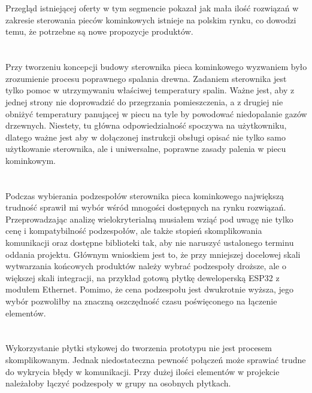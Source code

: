 \documentclass[11pt]{report}
\begin{document}
\section{}
Przegląd istniejącej oferty w tym segmencie pokazał jak mała ilość rozwiązań w zakresie sterowania pieców kominkowych istnieje na polskim rynku, co dowodzi temu, że potrzebne są nowe propozycje produktów.

\section{}
Przy tworzeniu koncepcji budowy sterownika pieca kominkowego wyzwaniem było zrozumienie procesu poprawnego spalania drewna. Zadaniem sterownika jest tylko pomoc w utrzymywaniu właściwej temperatury spalin. Ważne jest, aby z jednej strony nie doprowadzić do przegrzania pomieszczenia, a z drugiej nie obniżyć temperatury panującej w piecu na tyle by powodować niedopalanie gazów drzewnych. Niestety, tu główna odpowiedzialność spoczywa na użytkowniku, dlatego ważne jest aby w dołączonej instrukcji obsługi opisać nie tylko samo użytkowanie sterownika, ale i uniwersalne, poprawne zasady palenia w piecu kominkowym.

\section{}
Podczas wybierania podzespołów sterownika pieca kominkowego największą trudność sprawił mi wybór wśród mnogości dostępnych na rynku rozwiązań. Przeprowadzając analizę wielokryterialną musiałem wziąć pod uwagę nie tylko cenę i kompatybilność podzespołów, ale także stopień skomplikowania komunikacji oraz dostępne biblioteki tak, aby nie naruszyć ustalonego terminu oddania projektu.
Głównym wnioskiem jest to, że przy mniejszej docelowej skali wytwarzania końcowych produktów należy wybrać podzespoły droższe, ale o większej skali integracji, na przykład gotową płytkę deweloperską ESP32 z modułem Ethernet. Pomimo, że cena podzespołu jest dwukrotnie wyższa, jego wybór pozwoliłby na znaczną oszczędność czasu poświęconego na łączenie elementów.

\section{}
Wykorzystanie płytki stykowej do tworzenia prototypu nie jest procesem skomplikowanym. Jednak niedostateczna pewność połączeń może sprawiać trudne do wykrycia błędy w komunikacji.
Przy dużej ilości elementów w projekcie należałoby łączyć podzespoły w grupy na osobnych płytkach.
\end{document}

